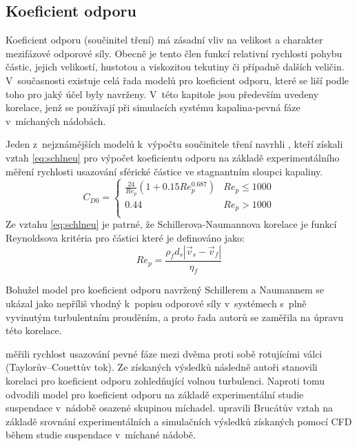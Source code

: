 \subsection{Koeficient odporu}
\label{kap:cd}
Koeficient odporu (součinitel tření) má zásadní vliv na velikost a charakter mezifázové odporové síly. Obecně je tento člen funkcí relativní rychlosti pohybu částic, jejich velikostí, hustotou a viskozitou tekutiny či případně dalších veličin. V~současnosti existuje celá řada modelů pro koeficient odporu, které se liší podle toho pro jaký účel byly navrženy. V~této kapitole jsou především uvedeny korelace, jenž se používají při simulacích systému kapalina-pevná fáze v~míchaných nádobách. 

Jeden z~nejznámějších modelů k~výpočtu součinitele tření navrhli \citet{schi32}, kteří získali vztah \ref{eq:schlneu} pro výpočet koeficientu odporu na základě experimentálního měření rychlosti usazování sférické částice ve stagnantním sloupci kapaliny.    
\begin{equation}
	\label{eq:schlneu}
  C_{D0} = \left\{ \begin{array}{ll}
  \frac{24}{Re_{p}}  \left( 1 + \num{0.15}Re_{p}^{\num{0.687}} \right) & Re_{p} \le 1000\\
  \num{0.44} & Re_{p} > 1000\\
  \end{array} \right.
\end{equation}
\noindent Ze vztahu \ref{eq:schlneu} je patrné, že Schillerova-Naumannova korelace je funkcí Reynoldsova kritéria pro částici které je definováno jako:
\begin{equation}
	Re_{p}= \frac{\rho_{f}d_{s}\left|\vec{v}_{s} - \vec{v}_{f}\right|}{\eta_{f}}
	\label{eq:reyp}
\end{equation}

Bohužel model pro koeficient odporu navržený Schillerem a Naumannem se ukázal jako nepříliš vhodný k~popisu odporové síly v~systémech s~plně vyvinutým turbulentním prouděním, a proto řada autorů se zaměřila na úpravu této korelace.

\citet{bru98} měřili rychlost usazování pevné fáze mezi dvěma proti sobě rotujícími válci (Taylorův–Couettův tok). Ze získaných výsledků následně autoři stanovili korelaci pro koeficient odporu zohledňující volnou turbulenci. Naproti tomu \citet{pin01} odvodili model pro koeficient odporu na základě experimentální studie suspendace v~nádobě osazené skupinou míchadel. \citet{kho06} upravili Brucátův vztah na základě srovnání experimentálních a simulačních výsledků získaných pomocí CFD během studie suspendace v~míchané nádobě. 

